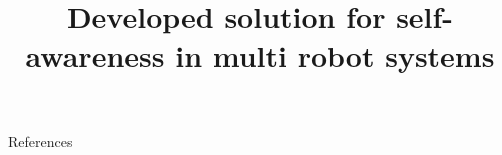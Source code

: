 \documentclass{beamer}
\title{Developed solution for self-awareness in multi robot systems}
\date{}
\renewcommand{\[}{\begingroup\small\OriginalDisplayMathOpen}
\renewcommand{\]}{\OriginalDisplayMathClose\endgroup}
\begin{document}
    
    \frame{\titlepage}
    
    
    
    
    
    
    
    
    
    
    
    
    
    
    
    
    
    
    
    
    
    
    
    
    \begin{frame}[allowframebreaks]{References}
        \tiny
        
        
    \end{frame}
\end{document}
